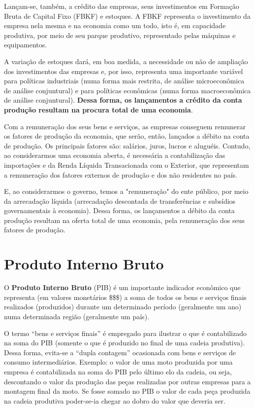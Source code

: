 \documentclass{article}\usepackage[]{graphicx}\usepackage[]{xcolor}
\begin{document}
Lançam-se, também, a crédito das empresas, seus investimentos em Formação Bruta de Capital Fixo (FBKF) e estoques. 
A FBKF representa o investimento da empresa nela mesma e na economia como um todo, isto é, em capacidade produtiva, 
por meio de seu parque produtivo, representado pelas máquinas e equipamentos.\par

A variação de estoques dará, em boa medida, a necessidade ou não de ampliação dos investimentos das empresas e, 
por isso, representa uma importante variável para políticas industriais (numa forma mais restrita, de análise 
microeconômica de análise conjuntural) e para políticas econômicas (numa forma macroeconômica de análise conjuntural). 
\textbf{Dessa forma, os lançamentos a crédito da conta produção resultam na procura total de uma economia}.\par

Com a remuneração dos seus bens e serviços, as empresas conseguem remunerar os fatores de produção da
economia, que serão, então, lançados a débito na conta de produção. Os principais fatores são: salários,
juros, lucros e aluguéis. Contudo, ao considerarmos uma economia aberta, é necessária a contabilização
das importações e da Renda Líquida Transacionada com o Exterior, que representam a remuneração dos
fatores externos de produção e dos não residentes no país.\par

E, ao considerarmos o governo, temos a "remuneração" do ente público, por meio da arrecadação líquida 
(arrecadação descontada de transferências e subsídios governamentais à economia). Dessa forma, os lançamentos 
a débito da conta produção resultam na oferta total de uma economia, pela remuneração dos seus fatores de produção.\par

\section*{Produto Interno Bruto}

O \textbf{Produto Interno Bruto} (PIB) é um importante indicador econômico que representa (em valores monetários \$\$\$) 
a soma de todos os bens e serviços finais realizados (produzidos) durante um determinado período (geralmente um ano) 
numa determinada região (geralmente um país).\par

O termo \enquote{bens e serviços finais} é empregado para ilustrar o que é contabilizado na soma do PIB 
(somente o que é produzido no final de uma cadeia produtiva). Dessa forma, evita-se a \enquote{dupla contagem} 
ocasionada com bens e serviços de consumo intermediários. Exemplo: o valor de uma moto produzida por uma empresa 
é contabilizada na soma do PIB pelo último elo da cadeia, ou seja, descontando o valor da produção das peças realizadas 
por outras empresas para a montagem final da moto. Se fosse somado no PIB o valor de cada peça produzida na cadeia 
produtiva poder-se-ia chegar ao dobro do valor que deveria ser.\par
\end{document}
